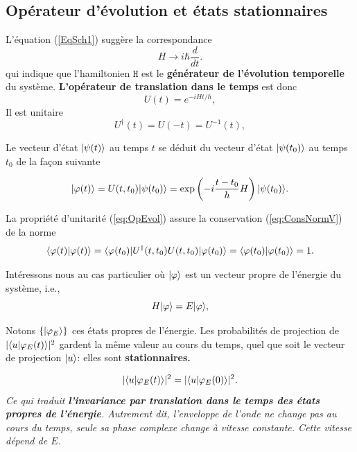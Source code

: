 \subsection{Opérateur d'évolution et états stationnaires}

L'équation (\ref{EqSch1}) suggère la correspondance%
\begin{equation}
H\rightarrow i\hbar\frac{d}{dt}.
\end{equation}
qui indique que l'hamiltonien $\mathtt{H}$ est le \textbf{générateur de
l'évolution
temporelle} du système. \textbf{L'opérateur de translation dans le temps} est
donc \begin{equation}
U(t)=e^{-iHt/\hbar},
\end{equation}
Il est unitaire
\begin{equation}
U^{\dagger}(t)=U(-t)=U^{-1}(t),
\label{eq:OpEvol}
\end{equation}

Le vecteur d'état $\vert\psi(t)\rangle$ au temps $t$ se déduit du vecteur d'état
$\vert\psi(t_0)\rangle$ au temps $t_0$ de la façon suivante

\colorbox[gray]{0.8}{
\parbox[c]{0.9\textwidth}{
\begin{equation}
\vert\varphi(t)\rangle=U(t,t_0)\vert\psi(t_0)\rangle=\exp\left(-i\frac{t-t_0}{h}H\right)
\vert\psi(t_0)\rangle.
\end{equation}
}}
\medskip

La propriété d'unitarité (\ref{eq:OpEvol}) assure la conservation
(\ref{eq:ConsNormV}) de la norme
\begin{equation}
\langle\varphi(t)\vert\varphi(t)\rangle=\langle\varphi(t_0)\vert U^{\dagger}(t,t_0)U(t,t_
{ 0})\vert\varphi(t_0)\rangle=\langle\varphi(t_0)\vert\varphi(t_0)\rangle=1.
\end{equation}

Intéressons nous au cas particulier où $\vert\varphi\rangle$ est un vecteur propre de
l'énergie du système, i.e.,
\begin{equation}
H\vert\varphi\rangle=E\vert\varphi\rangle,
\end{equation}

Notons $\{\vert\varphi_{E}\rangle\}$ ces états propres de l'énergie. Les probabilités
de projection de $|\langle u\vert\varphi _{E}(t)\rangle|^{2}$ gardent la même valeur
au cours du temps, quel que soit le vecteur de projection $\vert u\rangle$: elles sont
\textbf{stationnaires.}

\medskip\colorbox[gray]{0.8}{
\parbox[c]{0.9\textwidth}{
\begin{equation}
|\langle u\vert\varphi_{E}(t)\rangle|^{2}=|\langle u\vert\varphi_{E}(0)\rangle|^{2}.
\end{equation}
\emph{Ce qui traduit \textbf{l'invariance par translation dans le temps des
états propres de l'énergie}. Autrement dit, l'enveloppe de l'onde ne
change pas au cours du temps, seule sa phase complexe change à vitesse
constante. Cette vitesse dépend de $E$.}
}}
\medskip

